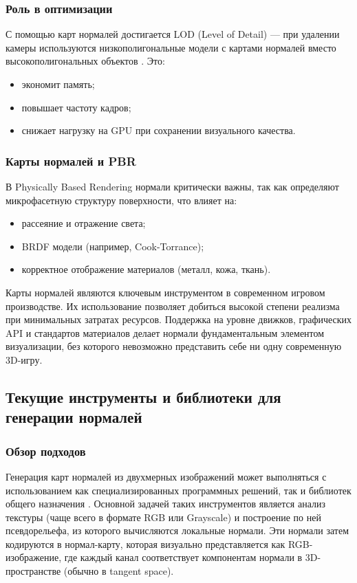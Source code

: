 \subsubsection{Роль в оптимизации}

С помощью карт нормалей достигается LOD (Level of Detail) — при удалении камеры используются низкополигональные модели с картами нормалей вместо высокополигональных объектов \cite{umbaugh2022}. Это:
\begin{itemize}
	\item экономит память;
	\item повышает частоту кадров;
	\item снижает нагрузку на GPU при сохранении визуального качества.
\end{itemize}
\subsubsection{Карты нормалей и PBR}

В Physically Based Rendering нормали критически важны, так как определяют микрофасетную структуру поверхности, что влияет на:
\begin{itemize}
	\item рассеяние и отражение света;
	\item BRDF модели (например, Cook-Torrance);
	\item корректное отображение материалов (металл, кожа, ткань).
\end{itemize}

Карты нормалей являются ключевым инструментом в современном игровом производстве. Их использование позволяет добиться высокой степени реализма при минимальных затратах ресурсов. Поддержка на уровне движков, графических API и стандартов материалов делает нормали фундаментальным элементом визуализации, без которого невозможно представить себе ни одну современную 3D-игру.
\subsection{Текущие инструменты и библиотеки для генерации нормалей}
\subsubsection{Обзор подходов}

Генерация карт нормалей из двухмерных изображений может выполняться с использованием как специализированных программных решений, так и библиотек общего назначения \cite{tyagi2021}. Основной задачей таких инструментов является анализ текстуры (чаще всего в формате RGB или Grayscale) и построение по ней псевдорельефа, из которого вычисляются локальные нормали. Эти нормали затем кодируются в нормал-карту, которая визуально представляется как RGB-изображение, где каждый канал соответствует компонентам нормали в 3D-пространстве (обычно в tangent space).

